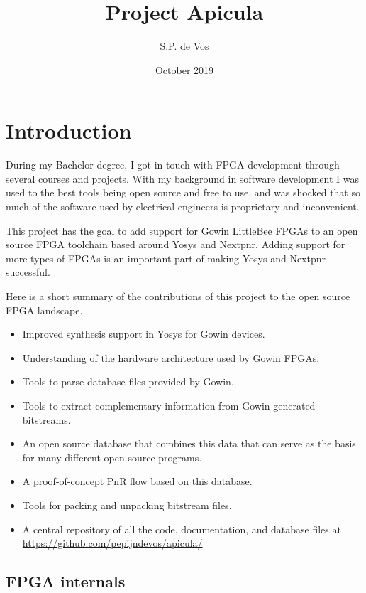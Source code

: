 \documentclass{article}
\title{Project Apicula}
\author{S.P. de Vos}
\date{October 2019}
\begin{document}
\maketitle

\tableofcontents

\section{Introduction}

During my Bachelor degree, I got in touch with FPGA development through several courses and projects. With my background in software development I was used to the best tools being open source and free to use, and was shocked that so much of the software used by electrical engineers is proprietary and inconvenient.

This project has the goal to add support for Gowin LittleBee FPGAs to an open source FPGA toolchain based around Yosys and Nextpnr. Adding support for more types of FPGAs is an important part of making Yosys and Nextpnr successful.

Here is a short summary of the contributions of this project to the open source FPGA landscape.

\begin{itemize}
    \item Improved synthesis support in Yosys for Gowin devices.
    \item Understanding of the hardware architecture used by Gowin FPGAs.
    \item Tools to parse database files provided by Gowin.
    \item Tools to extract complementary information from Gowin-generated bitstreams.
    \item An open source database that combines this data that can serve as the basis for many different open source programs.
    \item A proof-of-concept PnR flow based on this database.
    \item Tools for packing and unpacking bitstream files.
    \item A central repository of all the code, documentation, and database files at \url{https://github.com/pepijndevos/apicula/}
\end{itemize}

\subsection{FPGA internals}
\end{document}
